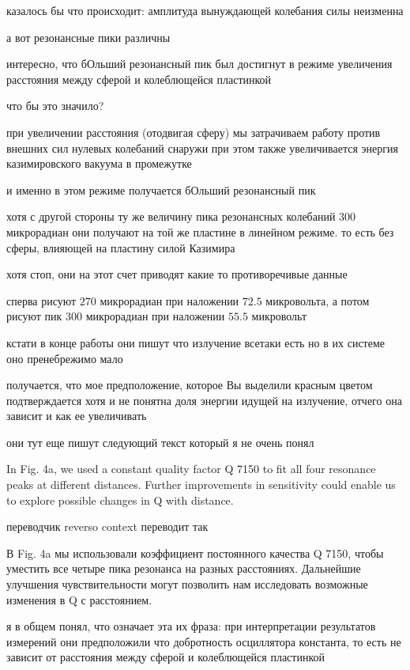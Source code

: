 \documentclass[12pt, letterpaper]{article}
\begin{document}
казалось бы что происходит: амплитуда вынуждающей колебания силы неизменна

а вот резонансные пики различны

интересно, что бОльший резонансный пик был достигнут в режиме увеличения расстояния между сферой и колеблющейся пластинкой

что бы это значило?

при увеличении расстояния (отодвигая сферу) мы затрачиваем работу против внешних сил нулевых колебаний снаружи
при этом также увеличивается энергия казимировского вакуума в промежутке

и именно в этом режиме получается бОльший резонансный пик

хотя с другой стороны ту же величину пика резонансных колебаний $300$ микрорадиан они получают на той же пластине в линейном режиме. то есть без сферы, влияющей на пластину силой Казимира

хотя стоп, они на этот счет приводят какие то противоречивые данные

сперва рисуют $270$ микрорадиан при наложении $72.5$ микровольта, а потом рисуют пик $300$ микрорадиан при наложении $55.5$ микровольт

кстати в конце работы они пишут что излучение всетаки есть но в их системе оно пренебрежимо мало

получается, что мое предположение, которое Вы выделили красным цветом подтверждается хотя и не понятна доля энергии идущей на излучение, отчего она зависит и как ее увеличивать

они тут еще пишут следующий текст который я не очень понял


In Fig. 4a, we used a constant quality factor Q 7150 to fit all four resonance peaks at different distances. Further improvements in sensitivity could enable us to explore possible changes in Q with distance.

переводчик reverso context переводит так

В Fig. 4a мы использовали коэффициент постоянного качества Q 7150, чтобы уместить все четыре пика резонанса на разных расстояниях. Дальнейшие улучшения чувствительности могут позволить нам исследовать возможные изменения в Q с расстоянием.


я в общем понял, что означает эта их фраза: при интерпретации результатов измерений они предположили что добротность осциллятора константа, то есть не зависит от расстояния между сферой и колеблющейся пластинкой
\end{document}
